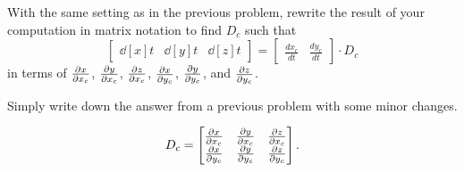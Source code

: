\documentclass{ximera}
\begin{document}
\begin{problem}
  With the same setting as in the previous problem, rewrite the result
  of your computation in matrix notation to find $D_c$
  such that
\[
\begin{bmatrix}
\dd[x]{t} & \dd[y]{t} & \dd[z]{t}
\end{bmatrix}
=
\begin{bmatrix}
\frac{dx_c}{dt} & \frac{dy_c}{dt}
\end{bmatrix}\cdot D_c
\]
in terms of $\pp[x]{x_c}$, $\pp[y]{x_c}$, $\pp[z]{x_c}$,
$\pp[x]{y_c}$, $\pp[y]{y_c}$, and $\pp[z]{y_c}$.
\begin{hint}
  Simply write down the answer from a previous problem with some minor
  changes.
\end{hint}
\begin{freeResponse}
  \[
  D_c =
  \begin{bmatrix}
    \pp[x]{x_c} & \pp[y]{x_c} & \pp[z]{x_c} \\
    \pp[x]{y_c}   & \pp[y]{y_c}   & \pp[z]{y_c}
  \end{bmatrix}.
  \]
\end{freeResponse}
\end{problem}
\end{document}
